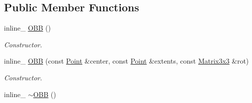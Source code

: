 \subsection*{Public Member Functions}
\begin{DoxyCompactItemize}
\item 
inline\+\_\+ \hyperlink{classOpcode_1_1OBB_aa6498dcfeb252d454210f8063f1ae853}{O\+BB} ()\hypertarget{classOpcode_1_1OBB_aa6498dcfeb252d454210f8063f1ae853}{}\label{classOpcode_1_1OBB_aa6498dcfeb252d454210f8063f1ae853}

\begin{DoxyCompactList}\small\item\em Constructor. \end{DoxyCompactList}\item 
inline\+\_\+ \hyperlink{classOpcode_1_1OBB_a3a26b516bec8ab5e937c9675de50fa9c}{O\+BB} (const \hyperlink{classOpcode_1_1Point}{Point} \&center, const \hyperlink{classOpcode_1_1Point}{Point} \&extents, const \hyperlink{classOpcode_1_1Matrix3x3}{Matrix3x3} \&rot)\hypertarget{classOpcode_1_1OBB_a3a26b516bec8ab5e937c9675de50fa9c}{}\label{classOpcode_1_1OBB_a3a26b516bec8ab5e937c9675de50fa9c}

\begin{DoxyCompactList}\small\item\em Constructor. \end{DoxyCompactList}\item 
inline\+\_\+ \hyperlink{classOpcode_1_1OBB_a5dc8bcfae8042513a0674ee7ef1a206d}{$\sim$\+O\+BB} ()\hypertarget{classOpcode_1_1OBB_a5dc8bcfae8042513a0674ee7ef1a206d}{}\label{classOpcode_1_1OBB_a5dc8bcfae8042513a0674ee7ef1a206d}


\end{DoxyCompactItemize}
